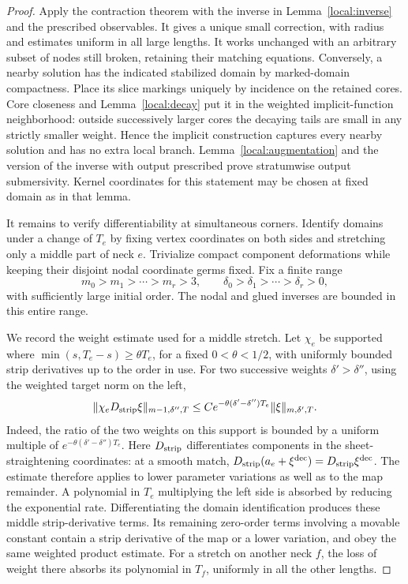 \documentclass[11pt]{article}
\theoremstyle{definition}
\theoremstyle{remark}
\numberwithin{equation}{section}
\begin{document}
\begin{proof}
Apply the contraction theorem with the inverse in
Lemma~\ref{local:inverse} and the prescribed observables.  It gives a
unique small correction, with radius and estimates uniform in all
large lengths.  It works unchanged with an arbitrary subset of nodes
still broken, retaining their matching equations.  Conversely, a
nearby solution has the indicated stabilized domain by marked-domain
compactness.  Place its slice markings uniquely by incidence on the
retained cores.  Core closeness and Lemma~\ref{local:decay} put it in
the weighted implicit-function neighborhood: outside successively
larger cores the decaying tails are small in any strictly smaller
weight.  Hence the implicit construction captures every nearby
solution and has no extra local branch.  Lemma~\ref{local:augmentation}
and the version of the inverse with output prescribed prove
stratumwise output submersivity.  Kernel coordinates for this
statement may be chosen at fixed domain as in that lemma.

It remains to verify differentiability at simultaneous corners.
Identify domains under a change of $T_e$ by fixing vertex coordinates
on both sides and stretching only a middle part of neck $e$.
Trivialize compact component deformations while keeping their disjoint
nodal coordinate germs fixed.  Fix a finite range
\[
 m_0>m_1>\cdots>m_r>3,\qquad
 \delta_0>\delta_1>\cdots>\delta_r>0,
\]
with sufficiently large initial order.  The nodal and glued inverses
are bounded in this entire range.

We record the weight estimate used for a middle stretch.
Let $\chi_e$ be supported where
$\min(s,T_e-s)\geq\theta T_e$, for a fixed $0<\theta<1/2$, with
uniformly bounded strip derivatives up to the order in use.
For two successive weights $\delta'>\delta''$, using the weighted
target norm on the left,
\[
 \|\chi_e D_{\rm strip}\xi\|_{m-1,\delta'',T}
 \leq C e^{-\theta(\delta'-\delta'')T_e}
                   \|\xi\|_{m,\delta',T}.
\]
Indeed, the ratio of the two weights on this support is bounded by a
uniform multiple of
$e^{-\theta(\delta'-\delta'')T_e}$.  Here $D_{\rm strip}$ differentiates
components in the sheet-straightening coordinates: at a smooth match,
$D_{\rm strip}(a_e+\xi^{\rm dec})=D_{\rm strip}\xi^{\rm dec}$.
The estimate therefore applies to lower parameter variations as well
as to the map remainder.  A polynomial in $T_e$ multiplying the
left side is absorbed by reducing the exponential rate.
Differentiating the domain identification produces these middle
strip-derivative terms.  Its remaining zero-order terms involving a
movable constant contain a strip derivative of the map or a lower
variation, and obey the same weighted product estimate.
For a stretch on another neck $f$, the loss of weight there absorbs
its polynomial in $T_f$, uniformly in all the other lengths.


\end{proof}
\end{document}
